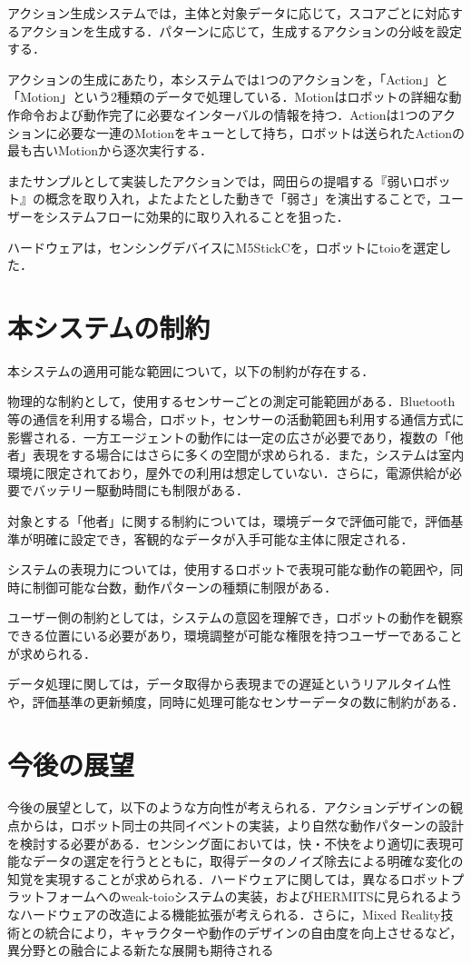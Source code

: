 \documentclass[paper=a4paper,jafontsize=9pt,head_space=15mm,gutter=20mm,
twocolumn,number_of_lines=49, line_length=26zw]{myuarticle}
\begin{document}
アクション生成システムでは，主体と対象データに応じて，スコアごとに対応するアクションを生成する．パターンに応じて，生成するアクションの分岐を設定する．

アクションの生成にあたり，本システムでは1つのアクションを，「Action」と「Motion」という2種類のデータで処理している．Motionはロボットの詳細な動作命令および動作完了に必要なインターバルの情報を持つ．Actionは1つのアクションに必要な一連のMotionをキューとして持ち，ロボットは送られたActionの最も古いMotionから逐次実行する．

またサンプルとして実装したアクションでは，岡田ら\cite{岡田-2017-弱いロボ}の提唱する『弱いロボット』の概念を取り入れ，よたよたとした動きで「弱さ」を演出することで，ユーザーをシステムフローに効果的に取り入れることを狙った．

ハードウェアは，センシングデバイスにM5StickCを，ロボットにtoioを選定した．

\section{本システムの制約}

本システムの適用可能な範囲について，以下の制約が存在する．

物理的な制約として，使用するセンサーごとの測定可能範囲がある．Bluetooth等の通信を利用する場合，ロボット，センサーの活動範囲も利用する通信方式に影響される．一方エージェントの動作には一定の広さが必要であり，複数の「他者」表現をする場合にはさらに多くの空間が求められる．また，システムは室内環境に限定されており，屋外での利用は想定していない．さらに，電源供給が必要でバッテリー駆動時間にも制限がある．

対象とする「他者」に関する制約については，環境データで評価可能で，評価基準が明確に設定でき，客観的なデータが入手可能な主体に限定される．

システムの表現力については，使用するロボットで表現可能な動作の範囲や，同時に制御可能な台数，動作パターンの種類に制限がある．

ユーザー側の制約としては，システムの意図を理解でき，ロボットの動作を観察できる位置にいる必要があり，環境調整が可能な権限を持つユーザーであることが求められる．

データ処理に関しては，データ取得から表現までの遅延というリアルタイム性や，評価基準の更新頻度，同時に処理可能なセンサーデータの数に制約がある．

\section{今後の展望}
今後の展望として，以下のような方向性が考えられる．アクションデザインの観点からは，ロボット同士の共同イベントの実装，より自然な動作パターンの設計を検討する必要がある．センシング面においては，快・不快をより適切に表現可能なデータの選定を行うとともに，取得データのノイズ除去による明確な変化の知覚を実現することが求められる．ハードウェアに関しては，異なるロボットプラットフォームへのweak-toioシステムの実装，およびHERMITSに見られるようなハードウェアの改造による機能拡張が考えられる．さらに，Mixed
Reality技術との統合により，キャラクターや動作のデザインの自由度を向上させるなど，異分野との融合による新たな展開も期待される
\end{document}
